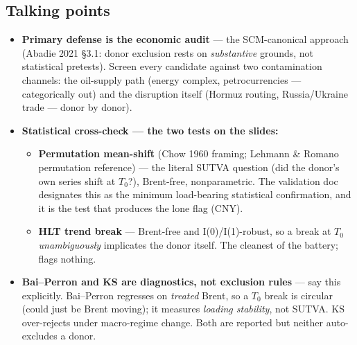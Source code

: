 \documentclass[11pt,a4paper]{article}
\newcommand{\highlight}[1]{\textcolor{accent}{\textbf{#1}}}
\begin{document}
\subsection{Talking points}
\begin{itemize}
  \item \highlight{Primary defense is the economic audit} --- the SCM-canonical approach (Abadie 2021
    \S3.1: donor exclusion rests on \emph{substantive} grounds, not statistical pretests). Screen every
    candidate against two contamination channels: the oil-supply path (energy complex, petrocurrencies
    --- categorically out) and the disruption itself (Hormuz routing, Russia/Ukraine trade --- donor by donor).
  \item \highlight{Statistical cross-check --- the two tests on the slides:}
    \begin{itemize}
      \item \highlight{Permutation mean-shift} (Chow 1960 framing; Lehmann \& Romano permutation
        reference) --- the literal SUTVA question (did the donor's own series shift at $T_0$?), Brent-free,
        nonparametric. The validation doc designates this as the minimum load-bearing statistical
        confirmation, and it is the test that produces the lone flag (CNY).
      \item \highlight{HLT trend break} --- Brent-free and I(0)/I(1)-robust, so a break at $T_0$
        \emph{unambiguously} implicates the donor itself. The cleanest of the battery; flags nothing.
    \end{itemize}
  \item \highlight{Bai--Perron and KS are diagnostics, not exclusion rules} --- say this explicitly.
    Bai--Perron regresses on \emph{treated} Brent, so a $T_0$ break is circular (could just be Brent
    moving); it measures \emph{loading stability}, not SUTVA. KS over-rejects under macro-regime change.
    Both are reported but neither auto-excludes a donor.
\end{itemize}
\end{document}
